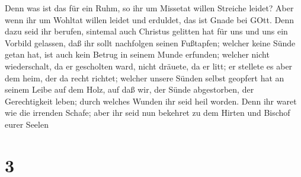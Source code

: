  Denn was ist das für ein Ruhm, so ihr um Missetat willen
Streiche leidet? Aber wenn ihr um Wohltat willen leidet und erduldet,
das ist Gnade bei GOtt.  Denn dazu seid ihr berufen,
sintemal auch Christus gelitten hat für uns und uns ein Vorbild
gelassen, daß ihr sollt nachfolgen seinen Fußtapfen; 
welcher keine Sünde getan hat, ist auch kein Betrug in seinem Munde
erfunden;  welcher nicht wiederschalt, da er gescholten
ward, nicht dräuete, da er litt; er stellete es aber dem heim, der da
recht richtet;  welcher unsere Sünden selbst geopfert hat
an seinem Leibe auf dem Holz, auf daß wir, der Sünde abgestorben, der
Gerechtigkeit leben; durch welches Wunden ihr seid heil worden.
 Denn ihr waret wie die irrenden Schafe; aber ihr seid nun
bekehret zu dem Hirten und Bischof eurer Seelen

\hypertarget{section-2}{%
\section{3}\label{section-2}}

